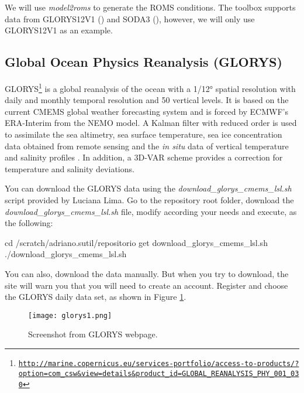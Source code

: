 We will use \textit{model2roms} to generate the ROMS conditions. The toolbox supports data from GLORYS12V1 (\cite{Fernandez2018}) 
and SODA3 (\cite{Carton2018}), however, we will only use GLORYS12V1 as an example.

\subsection{Global Ocean Physics Reanalysis (GLORYS)}
\bigskip

GLORYS\textcolor{bleu_cite}{\textit{}\footnote{\textcolor{bleu_cite}{\href{http://marine.copernicus.eu/services-portfolio/access-to-products/?option=com\_csw\&view=details\&product\_id=GLOBAL\_REANALYSIS\_PHY\_001\_030}{\nolinkurl{http://marine.copernicus.eu/services-portfolio/access-to-products/?option=com\_csw\&view=details\&product\_id=GLOBAL\_REANALYSIS\_PHY\_001\_030}}}}}
is a global reanalysis of the ocean with a 1/12° spatial resolution with daily and monthly temporal resolution and 
50 vertical levels. It is based on the current CMEMS global weather forecasting system and is forced by ECMWF's ERA-Interim from the NEMO model.
A Kalman filter with reduced order is used to assimilate the sea altimetry, sea surface temperature, sea ice concentration data obtained 
from remote sensing and the \textit{in situ} data of vertical temperature and salinity profiles .
In addition, a 3D-VAR scheme provides a correction for temperature and salinity deviations.
\bigskip

You can download the GLORYS data using the \textit{download\_glorys\_cmems\_lsl.sh} script provided by Luciana Lima. Go to the repository root folder, download the \textit{download\_glorys\_cmems\_lsl.sh}
file, modify according your needs and execute, as the following:
\bigskip

\begin{bashcode}
cd /scratch/adriano.sutil/repositorio
get download_glorys_cmems_lsl.sh
./download_glorys_cmems_lsl.sh
\end{bashcode}
\bigskip

You can also, download the data manually. But when you try to download, the site will warn you that you will need to create an account.
Register and choose the GLORYS daily data set, as shown in Figure \textcolor{bleu_cite}{\ref{glorys1}}.
\bigskip

\begin{figure}[H]
    \centering
    \texttt{[image: glorys1.png]}
    \caption{Screenshot from GLORYS webpage.}
    \label{glorys1}
\end{figure}
\bigskip

